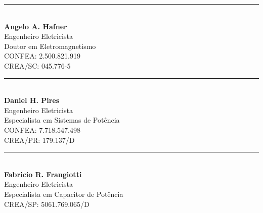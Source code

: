 \documentclass[a4paper]{article}
\begin{document}
\noindent %
\begin{minipage}[t]{0.3\textwidth}
	\centering
	\vspace{4cm}
	\rule{5cm}{0.4pt}\\
	{\linespread{0.9}\selectfont %
		\textbf{Angelo A. Hafner}\\
		\small
		Engenheiro Eletricista\\ Doutor em Eletromagnetismo\\
		CONFEA: 2.500.821.919\\
		CREA/SC: 045.776-5\\
	}
\end{minipage}
\hfill %
\begin{minipage}[t]{0.3\textwidth}
	\centering
	\vspace{4cm}
	\rule{5cm}{0.4pt}\\
	{\linespread{0.9}\selectfont %
		\textbf{Daniel H. Pires}\\
		\small
		Engenheiro Eletricista\\ Especialista em Sistemas de Potência\\
		CONFEA: 7.718.547.498\\
		CREA/PR: 179.137/D\\
	}
\end{minipage}
\hfill %
\begin{minipage}[t]{0.3\textwidth}
	\centering
	\vspace{4cm}
	\rule{5cm}{0.4pt}\\
	{\linespread{0.9}\selectfont %
		\textbf{Fabricio R. Frangiotti}\\
		\small
		Engenheiro Eletricista\\ Especialista em Capacitor de Potência\\
		CREA/SP: 5061.769.065/D\\
	}
\end{minipage}
\end{document}
